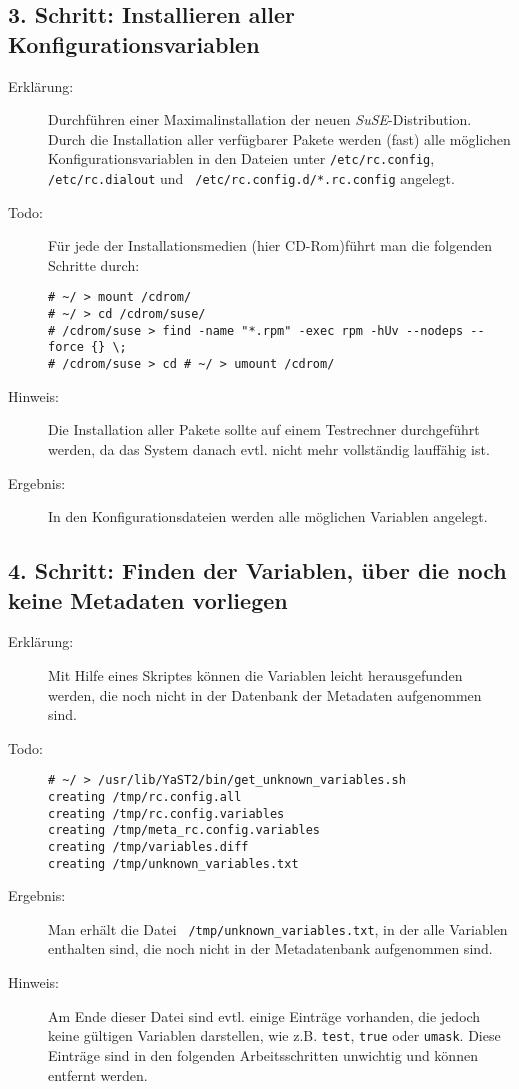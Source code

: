 \documentclass[pdftex,titlepage,10pt]{article}
\begin{document}
\subsection*{3. Schritt: Installieren aller Konfigurationsvariablen}
\begin{description}
\item[Erkl\"arung:] Durchf\"uhren einer Maximalinstallation der neuen
  {\em SuSE}-Distribution. Durch die Installation aller verf\"ugbarer
  Pakete werden (fast) alle m\"oglichen Konfigurationsvariablen in den
  Dateien unter {\tt /etc/rc.config}, {\tt /etc/rc.dialout} und {\tt
    /etc/rc.config.d/*.rc.config} angelegt.
\item[Todo:] F\"ur jede der Installationsmedien (hier CD-Rom)f\"uhrt man
die folgenden Schritte durch: {\footnotesize
\begin{verbatim}
# ~/ > mount /cdrom/
# ~/ > cd /cdrom/suse/ 
# /cdrom/suse > find -name "*.rpm" -exec rpm -hUv --nodeps --force {} \;
# /cdrom/suse > cd # ~/ > umount /cdrom/
\end{verbatim}}
  \item[Hinweis:] Die Installation aller Pakete sollte auf einem
    Testrechner durchgef\"uhrt werden, da das System danach evtl.
    nicht mehr vollst\"andig lauff\"ahig ist.
  \item[Ergebnis:] In den Konfigurationsdateien werden alle m\"oglichen
    Variablen angelegt.
\end{description}
\subsection*{4. Schritt: Finden der Variablen, \"uber die noch keine Metadaten
  vorliegen}
\begin{description}
\item[Erkl\"arung:] Mit Hilfe eines Skriptes k\"onnen die Variablen
  leicht herausgefunden werden, die noch nicht in der Datenbank der
  Metadaten aufgenommen sind.
\item[Todo:]
{\footnotesize\begin{verbatim}
# ~/ > /usr/lib/YaST2/bin/get_unknown_variables.sh
creating /tmp/rc.config.all
creating /tmp/rc.config.variables
creating /tmp/meta_rc.config.variables
creating /tmp/variables.diff
creating /tmp/unknown_variables.txt
\end{verbatim}}
\item[Ergebnis:] Man erh\"alt die Datei {\tt
    /tmp/unknown\_variables.txt}, in der alle Variablen enthalten
  sind, die noch nicht in der Metadatenbank aufgenommen sind.
\item[Hinweis:] Am Ende dieser Datei sind evtl. einige Eintr\"age
  vorhanden, die jedoch keine g\"ultigen Variablen
  darstellen, wie z.B.  {\tt test}, {\tt true} oder {\tt umask}.
  Diese Eintr\"age sind in den folgenden Arbeitsschritten unwichtig
  und k\"onnen entfernt werden.
\end{description}
\end{document}
